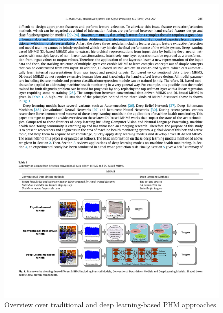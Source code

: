 \begin{figure}
  \centering
  \includegraphics[width=1\textwidth]{hand_crafted_features_physical_models_deep_learning.pdf}
  \caption {Overview over traditional and deep learning-based PHM approaches \cite{ZHAO2019213}} \label{fig:hand_crafted_features_physical_models_deep_learning}
\end{figure}

